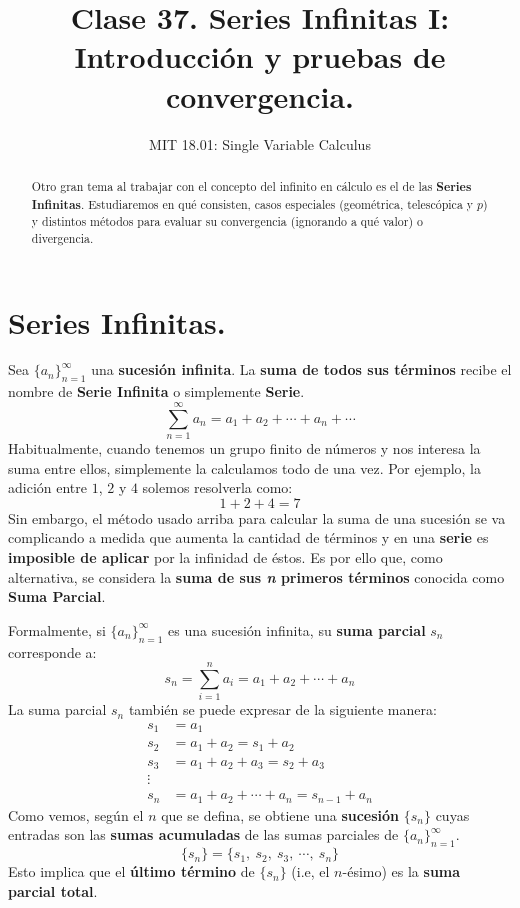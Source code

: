 \documentclass[12pt]{article}
\title{Clase 37. Series Infinitas I: Introducción y pruebas de convergencia.}
\author{MIT 18.01: Single Variable Calculus}
\date{}
\begin{document}
\maketitle

\begin{abstract}
\noindent Otro gran tema al trabajar con el concepto del infinito en cálculo es el de las \textbf{Series Infinitas}. Estudiaremos en qué consisten, casos especiales (geométrica, telescópica y $p$) y distintos métodos para evaluar su convergencia (ignorando a qué valor) o divergencia.
\end{abstract}


\section{Series Infinitas.}

Sea $\{a_{n}\}_{n = 1}^{\infty}$ una \textbf{sucesión infinita}. La \textbf{suma de todos sus términos} recibe el nombre de \textbf{Serie Infinita} o simplemente \textbf{Serie}.
\[
  \sum_{n = 1}^{\infty} a_{n} = a_{1} + a_{2} + \cdots + a_{n} + \cdots
\]
Habitualmente, cuando tenemos un grupo finito de números y nos interesa la suma entre ellos, simplemente la calculamos todo de una vez. Por ejemplo, la adición entre $1$, $2$ y $4$ solemos resolverla como:
\[
  1 + 2 + 4 = 7
\]
Sin embargo, el método usado arriba para calcular la suma de una sucesión se va complicando a medida que aumenta la cantidad de términos y en una \textbf{serie} es \textbf{imposible de aplicar} por la infinidad de éstos. Es por ello que, como alternativa, se considera la \textbf{suma de sus \textit{n} primeros términos} conocida como \textbf{Suma Parcial}.

Formalmente, si $\{a_{n}\}_{n = 1}^{\infty}$ es una sucesión infinita, su \textbf{suma parcial} $s_{n}$ corresponde a:
\[
  s_{n} = \sum_{i = 1}^{n} a_{i} = a_{1} + a_{2} + \cdots + a_{n}
\]
La suma parcial $s_{n}$ también se puede expresar de la siguiente manera:
\begin{align*}
s_{1} &= a_{1} \\
s_{2} &= a_{1} + a_{2} = s_{1} + a_{2} \\
s_{3} &= a_{1} + a_{2} + a_{3} = s_{2} + a_{3} \\
\vdots \\
s_{n} &= a_{1} + a_{2} + \cdots + a_{n} = s_{n - 1} + a_{n}
\end{align*}
Como vemos, según el $n$ que se defina, se obtiene una \textbf{sucesión} $\{s_{n}\}$ cuyas entradas son las \textbf{sumas acumuladas} de las sumas parciales de $\{a_{n}\}_{n = 1}^{\infty}$.
\[
  \{s_{n}\} = \{s_{1}, \ s_{2}, \ s_{3}, \ \cdots, \ s_{n}\}
\]
Esto implica que el \textbf{último término} de $\{s_{n}\}$ (i.e, el $n$-ésimo) es la \textbf{suma parcial total}.
\end{document}
